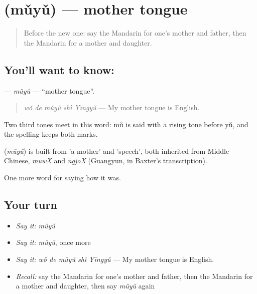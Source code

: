 \section[\texorpdfstring{\zh{母语} (mǔyǔ)}{母语 (mǔyǔ)}]{ (mǔyǔ) — mother tongue}

\label{lesson:ZH-C509-muyu}



\begin{quote}
Before the new one: say the Mandarin for one's mother and father, then the Mandarin for a mother and daughter.
\end{quote}

\subsection*{You'll want to know: }
\textbf{} — \emph{mǔyǔ} — \textquotedblleft{}mother tongue\textquotedblright{}.

\begin{quote}
\emph{wǒ de mǔyǔ shì Yīngyǔ} — My mother tongue is English.
\end{quote}

Two third tones meet in this word: mǔ is said with a rising tone before yǔ, and the spelling keeps both marks.

\begin{cousinweb}
\textbf{} (\emph{mǔyǔ}) is built from  'a mother' and  'speech', both inherited from Middle Chinese, \emph{muwX} and \emph{ngjoX} (Guangyun, in Baxter's transcription).
\end{cousinweb}

\begin{grammarlens}[title={What you've built}]
One more word for saying how it was.
\end{grammarlens}

\subsection*{Your turn}
\begin{itemize}
\raggedright
  \item \emph{Say it:} \emph{mǔyǔ}
  \item \emph{Say it:} \emph{mǔyǔ}, once more
  \item \emph{Say it:} \emph{wǒ de mǔyǔ shì Yīngyǔ} — My mother tongue is English.
  \item \emph{Recall:} say the Mandarin for one's mother and father, then the Mandarin for a mother and daughter, then say \emph{mǔyǔ} again
\end{itemize}

